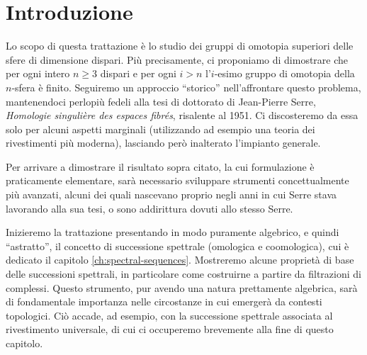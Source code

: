 \chapter*{Introduzione}
Lo scopo di questa trattazione è lo studio dei gruppi di omotopia superiori delle sfere di dimensione dispari. Più precisamente, ci proponiamo di dimostrare che per ogni intero \(n\ge 3\) dispari e per ogni \(i>n\) l'\(i\)-esimo gruppo di omotopia della \(n\)-sfera è finito. Seguiremo un approccio \enquote{storico} nell'affrontare questo problema, mantenendoci perlopiù fedeli alla tesi di dottorato di Jean-Pierre Serre, \emph{Homologie singulière des espaces fibrés}, risalente al 1951. Ci discosteremo da essa solo per alcuni aspetti marginali (utilizzando ad esempio una teoria dei rivestimenti più moderna), lasciando però inalterato l'impianto generale.

Per arrivare a dimostrare il risultato sopra citato, la cui formulazione è praticamente elementare, sarà necessario sviluppare strumenti concettualmente più avanzati, alcuni dei quali nascevano proprio negli anni in cui Serre stava lavorando alla sua tesi, o sono addirittura dovuti allo stesso Serre.

Inizieremo la trattazione presentando in modo puramente algebrico, e quindi \enquote{astratto}, il concetto di successione spettrale (omologica e coomologica), cui è dedicato il capitolo \ref{ch:spectral-sequences}. Mostreremo alcune proprietà di base delle successioni spettrali, in particolare come costruirne a partire da filtrazioni di complessi. Questo strumento, pur avendo una natura prettamente algebrica, sarà di fondamentale importanza nelle circostanze in cui emergerà da contesti topologici. Ciò accade, ad esempio, con la successione spettrale associata al rivestimento universale, di cui ci occuperemo brevemente alla fine di questo capitolo.

